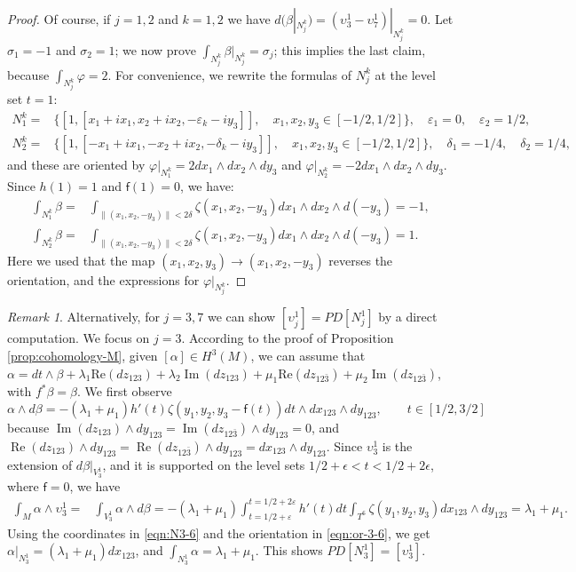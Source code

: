 \documentclass[10pt]{article}
\newcommand{\e}{\varepsilon}
\newcommand{\real}{\operatorname{\mathrm{Re}}}
\newcommand{\imag}{\operatorname{\mathrm{Im}}}
\newcommand{\re}{\mathrm{Re}}
\theoremstyle{plain}
\theoremstyle{definition}
\theoremstyle{remark}
\newtheorem{remark}{Remark}
\begin{document}
\begin{proof}
Of course, if $j=1,2$ and $k=1,2$ we have $d(\beta|_{N_j^k})=(\upsilon_3^1-\upsilon_7^1)|_{N_j^k}=0$. Let $\sigma_1=-1$ and $\sigma_2=1$; we now prove
$
\int_{N_j^k}{\beta|_{N_j^k}}=\sigma_j
$; this implies the last claim, because
$\int_{N_j^k}{\varphi}=2$.
For convenience, we rewrite the formulas of $N_j^k$ at the level set $t=1$:
\begin{align}
N_1^k=&\{[1,[x_1+ix_1,x_2+ix_2,-\e_k - iy_3]], \quad x_1,x_2,y_3 \in [-1/2,1/2]\}, \quad \e_1=0, \quad \e_2=1/2,\\
N_2^k=&\{[1,[-x_1+ix_1,-x_2+ix_2,-\delta_k - iy_3]], \quad x_1,x_2,y_3 \in [-1/2,1/2] \}, \quad \delta_1=-1/4, \quad \delta_2=1/4,
\end{align}
and these are oriented by $\varphi|_{N_1^k}=2 dx_{1}\wedge dx_2 \wedge dy_3$ and $\varphi|_{N_2^k}=-2 dx_{1}\wedge dx_2 \wedge dy_3$. Since $h(1)=1$ and $\mathsf{f}(1)=0$, we have:
\begin{align*}
\int_{N_1^k} \beta=& \int_{\|(x_1,x_2,-y_3)\|<2\delta} \zeta(x_1,x_2,-y_3) dx_1\wedge dx_2 \wedge d(-y_3)= -1,\\
\int_{N_2^k} \beta=& \int_{\|(x_1,x_2,-y_3)\|<2\delta} \zeta(x_1,x_2,-y_3) dx_1\wedge dx_2 \wedge d(-y_3)=1.
\end{align*}
Here we used that the map $(x_1,x_2,y_3) \to (x_1,x_2,-y_3)$ reverses the orientation, and the expressions for $\varphi|_{N_j^k}$. 
\end{proof}

\begin{remark}
Alternatively, for $j=3,7$ we can show $[\upsilon_j^1]=PD[N_j^1]$ by a direct computation. We focus on $j=3$.
According to the proof of Proposition \ref{prop:cohomology-M}, given $[\alpha] \in H^3(M)$, we can assume that $\alpha= dt\wedge \beta + \lambda_1 \re(dz_{123}) + \lambda_2\imag(dz_{123}) + \mu_1 \re(dz_{12\bar{3}}) + \mu_2\imag(dz_{12\bar{3}})$, with $f^*\beta=\beta$. 
We first observe
$$
\alpha \wedge d\beta = -(\lambda_1+\mu_1) h'(t)\zeta(y_1,y_2,y_3-\mathsf{f}(t)) dt\wedge dx_{123}\wedge dy_{123}, \qquad t\in [1/2,3/2]
$$
because $\imag(dz_{12{3}})\wedge dy_{123}= \imag(dz_{12\bar{3}})\wedge dy_{123}  =0$, and $\real(dz_{12{3}})\wedge dy_{123} = \real(dz_{12\bar{3}})\wedge dy_{123}=dx_{123}\wedge dy_{123}$. Since $\upsilon_3^1$ is the extension of $d\beta|_{V_3^1}$, and it is supported on the level sets  $1/2+\epsilon<t<1/2+2\epsilon$, where $\mathsf{f}=0$, we have
\begin{align*}
\int_{M} \alpha \wedge \upsilon_3^1=&\int_{V_3^1} \alpha \wedge d\beta 
=  - (\lambda_1+\mu_1) \int_{t=1/2+\e}^{t=1/2+2\e} h'(t)dt \int_{T^6} \zeta(y_1,y_2,y_3) dx_{123}\wedge dy_{123} = \lambda_1+\mu_1.
\end{align*}
Using the coordinates in \eqref{eqn:N3-6} and the orientation in \eqref{eqn:or-3-6}, we get $\alpha|_{N_3^1}=(\lambda_1+\mu_1) dx_{123}$, and $\int_{N_3^1} \alpha = \lambda_1+\mu_1$. This shows $PD[N_3^1]=[\upsilon_3^1]$.
\end{remark}
\end{document}
